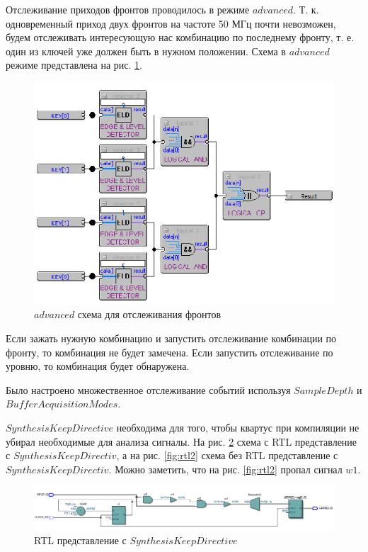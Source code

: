\documentclass[a4paper,14pt]{article}
\begin{document}
	Отслеживание приходов фронтов проводилось в режиме $advanced$.
	Т. к. одновременный приход двух фронтов на частоте 50 МГц почти невозможен, будем отслеживать интересующую нас комбинацию по последнему фронту, т. е. один из ключей уже должен быть в нужном положении.
	Схема в $advanced$ режиме представлена на рис. \ref{fig:advancedscheme}.

	\begin{figure}[H]
		\centering
		\includegraphics[width=0.7\linewidth]{images/advanced_scheme}
		\caption{$advanced$ схема для отслеживания фронтов}
		\label{fig:advancedscheme}
	\end{figure}

	Если зажать нужную комбинацию и запустить отслеживание комбинации по фронту, то комбинация не будет замечена.
	Если запустить отслеживание по уровню, то комбинация будет обнаружена.
	
	Было настроено множественное отслеживание событий используя $Sample Depth$ и $Buffer Acquisition Modes$.

	$Synthesis Keep Directive$ необходима для того, чтобы квартус при компиляции не убирал необходимые для анализа сигналы.
	На рис. \ref{fig:rtl1} схема с RTL представление с $Synthesis Keep Directiv$, а на рис. \ref{fig:rtl2} схема без RTL представление с $Synthesis Keep Directiv$.
	Можно заметить, что на рис. \ref{fig:rtl2} пропал сигнал $w1$.
	
	\begin{figure}[H]
		\centering
		\includegraphics[width=0.7\linewidth]{images/rtl_1}
		\caption{RTL представление с $Synthesis Keep Directive$}
		\label{fig:rtl1}
	\end{figure}
	
\end{document}
